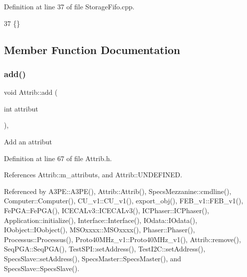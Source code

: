 Definition at line 37 of file Storage\+Fifo.\+cpp.


\begin{DoxyCode}
37 \{\} 
\end{DoxyCode}


\subsection{Member Function Documentation}
\mbox{\label{classAttrib_a235f773af19c900264a190b00a3b4ad7}} 
\subsubsection{\texorpdfstring{add()}{add()}}
{\footnotesize\ttfamily void Attrib\+::add (\begin{DoxyParamCaption}\item[{int}]{attribut }\end{DoxyParamCaption})\hspace{0.3cm}{\ttfamily [inline]}, {\ttfamily [inherited]}}

Add an attribut 

Definition at line 67 of file Attrib.\+h.



References Attrib\+::m\+\_\+attributs, and Attrib\+::\+U\+N\+D\+E\+F\+I\+N\+ED.



Referenced by A3\+P\+E\+::\+A3\+P\+E(), Attrib\+::\+Attrib(), Specs\+Mezzanine\+::cmdline(), Computer\+::\+Computer(), C\+U\+\_\+v1\+::\+C\+U\+\_\+v1(), export\+\_\+obj(), F\+E\+B\+\_\+v1\+::\+F\+E\+B\+\_\+v1(), Fe\+P\+G\+A\+::\+Fe\+P\+G\+A(), I\+C\+E\+C\+A\+Lv3\+::\+I\+C\+E\+C\+A\+Lv3(), I\+C\+Phaser\+::\+I\+C\+Phaser(), Application\+::initialize(), Interface\+::\+Interface(), I\+Odata\+::\+I\+Odata(), I\+Oobject\+::\+I\+Oobject(), M\+S\+Oxxxx\+::\+M\+S\+Oxxxx(), Phaser\+::\+Phaser(), Processus\+::\+Processus(), Proto40\+M\+Hz\+\_\+v1\+::\+Proto40\+M\+Hz\+\_\+v1(), Attrib\+::remove(), Seq\+P\+G\+A\+::\+Seq\+P\+G\+A(), Test\+S\+P\+I\+::set\+Address(), Test\+I2\+C\+::set\+Address(), Specs\+Slave\+::set\+Address(), Specs\+Master\+::\+Specs\+Master(), and Specs\+Slave\+::\+Specs\+Slave().


